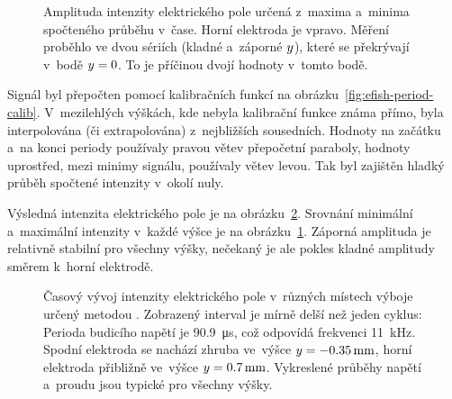 \begin{figure}[htp]
	\centering
	
	\caption{Amplituda intenzity elektrického pole určená z~maxima
		a~minima spočteného průběhu v~čase.
		Horní elektroda je vpravo.
		Měření proběhlo ve dvou sériích (kladné a~záporné $y$),
		které se překrývají v~bodě $y = 0$.
		To je příčinou dvojí hodnoty v~tomto bodě.}
	\label{fig:efish-period-amplitude}
\end{figure}

Signál byl přepočten pomocí kalibračních funkcí
na obrázku~\ref{fig:efish-period-calib}.
V~mezilehlých výškách, kde nebyla kalibrační funkce známa přímo,
byla interpolována (či extrapolována) z~nejbližších sousedních.
Hodnoty na začátku a~na konci periody používaly pravou větev
přepočetní paraboly,
hodnoty uprostřed, mezi minimy signálu, používaly větev levou.
Tak byl zajištěn hladký průběh spočtené intenzity v~okolí nuly.

Výsledná intenzita elektrického pole je na
obrázku~\ref{fig:efish-period-elfield}.
Srovnání minimální a~maximální intenzity v~každé výšce je
na obrázku~\ref{fig:efish-period-amplitude}.
Záporná amplituda je relativně stabilní pro všechny výšky,
nečekaný je ale pokles kladné amplitudy směrem k~horní elektrodě.

\begin{figure}[hbp]
	
	\caption{Časový vývoj intenzity elektrického pole v~různých místech výboje
		určený metodou \EFISH{}.
		Zobrazený interval je mírně delší než jeden cyklus:
		Perioda budicího napětí je \SI{90.9}{\micro\second},
		což odpovídá frekvenci \SI{11}{\kilo\hertz}.
		Spodní elektroda se nachází zhruba ve~výšce
		$y = \SI{-0.35}{\milli\metre}$,
		horní elektroda přibližně ve~výšce
		$y = \SI{0.7}{\milli\metre}$.
		Vykreslené průběhy napětí a~proudu jsou typické pro všechny výšky.}
	\label{fig:efish-period-elfield}
\end{figure}
